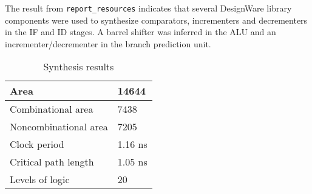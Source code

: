 The result from \texttt{report\_resources} indicates that several DesignWare library components were used to synthesize comparators, incrementers and decrementers in the IF and ID stages. A barrel shifter was inferred in the ALU and an incrementer/decrementer in the branch prediction unit.

\begin{table}[h]
	\centering
	\begin{tabular}{|l|l|}
		\hline
		Area & 14644 \\\hline
		Combinational area & 7438 \\\hline
		Noncombinational area &7205\\\hline
		Clock period & 1.16 ns \\\hline
		Critical path length & 1.05 ns\\\hline
		Levels of logic & 20 \\\hline

	\end{tabular}
\caption{Synthesis results}
\label{tab:synres}
\end{table}
